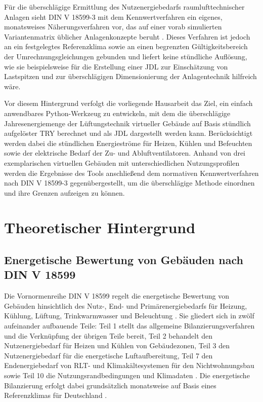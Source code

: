 \documentclass{scrreprt}
\begin{document}
Für die überschlägige Ermittlung des Nutzenergiebedarfs
raumlufttechnischer Anlagen sieht DIN V 18599-3 mit dem
Kennwertverfahren ein eigenes, monatsweises Näherungsverfahren vor,
das auf einer vorab simulierten Variantenmatrix üblicher
Anlagenkonzepte beruht \parencite{DIN185993}. Dieses Verfahren ist
jedoch an ein festgelegtes Referenzklima sowie an einen begrenzten
Gültigkeitsbereich der Umrechnungsgleichungen gebunden und liefert
keine stündliche Auflösung, wie sie beispielsweise für die
Erstellung einer \ac{JDL} zur Einschätzung von Lastspitzen und zur
überschlägigen Dimensionierung der Anlagentechnik hilfreich wäre.

Vor diesem Hintergrund verfolgt die vorliegende Hausarbeit das Ziel,
ein einfach anwendbares Python-Werkzeug zu entwickeln, mit dem die
überschlägige Jahresenergiemenge der Lüftungstechnik virtueller
Gebäude auf Basis stündlich aufgelöster \ac{TRY} berechnet und als
\ac{JDL} dargestellt werden kann. Berücksichtigt werden dabei die
stündlichen Energieströme für Heizen, Kühlen und Befeuchten sowie der
elektrische Bedarf der Zu- und Abluftventilatoren. Anhand von drei
exemplarischen virtuellen Gebäuden mit unterschiedlichen
Nutzungsprofilen werden die
Ergebnisse des Tools anschließend dem normativen Kennwertverfahren
nach DIN V 18599-3 gegenübergestellt, um die überschlägige Methode
einordnen und ihre Grenzen aufzeigen zu können.


\chapter{Theoretischer Hintergrund}\label{chap:Theorie}

\section{Energetische Bewertung von Gebäuden nach DIN V 18599}
Die Vornormenreihe DIN V 18599 regelt die energetische Bewertung von
Gebäuden hinsichtlich des Nutz-, End- und Primärenergiebedarfs für
Heizung, Kühlung, Lüftung, Trinkwarmwasser und Beleuchtung
\parencite{DIN1859910}. Sie gliedert sich in zwölf aufeinander
aufbauende Teile: Teil 1 stellt das allgemeine Bilanzierungsverfahren
und die Verknüpfung der übrigen Teile bereit, Teil 2 behandelt den
Nutzenergiebedarf für Heizen und Kühlen von Gebäudezonen, Teil 3 den
Nutzenergiebedarf für die energetische Luftaufbereitung, Teil 7 den
Endenergiebedarf von \ac{RLT}- und Klimakältesystemen für den
Nichtwohnungsbau sowie Teil 10 die Nutzungsrandbedingungen und
Klimadaten \parencite{DIN1859910}. Die energetische Bilanzierung
erfolgt dabei grundsätzlich monatsweise auf Basis eines
Referenzklimas für Deutschland \parencite{DIN185993}.
\end{document}

